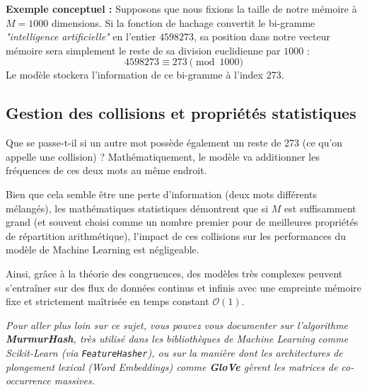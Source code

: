 \textbf{Exemple conceptuel :}
Supposons que nous fixions la taille de notre mémoire à $M = 1000$ dimensions. 
Si la fonction de hachage convertit le bi-gramme \textit{"intelligence artificielle"} en l'entier $4598273$, sa position dans notre vecteur mémoire sera simplement le reste de sa division euclidienne par $1000$ :
$$ 4598273 \equiv 273 \pmod{1000} $$
Le modèle stockera l'information de ce bi-gramme à l'index 273.

\subsection*{Gestion des collisions et propriétés statistiques}

Que se passe-t-il si un autre mot possède également un reste de 273 (ce qu'on appelle une collision) ? Mathématiquement, le modèle va additionner les fréquences de ces deux mots au même endroit. 

Bien que cela semble être une perte d'information (deux mots différents mélangés), les mathématiques statistiques démontrent que si $M$ est suffisamment grand (et souvent choisi comme un nombre premier pour de meilleures propriétés de répartition arithmétique), l'impact de ces collisions sur les performances du modèle de Machine Learning est négligeable. 

Ainsi, grâce à la théorie des congruences, des modèles très complexes peuvent s'entraîner sur des flux de données continus et infinis avec une empreinte mémoire fixe et strictement maîtrisée en temps constant $\mathcal{O}(1)$.

\vspace{0.5cm}
\begin{center}
\textit{Pour aller plus loin sur ce sujet, vous pouvez vous documenter sur l'algorithme \textbf{MurmurHash}, très utilisé dans les bibliothèques de Machine Learning comme Scikit-Learn (via \texttt{FeatureHasher}), ou sur la manière dont les architectures de plongement lexical (Word Embeddings) comme \textbf{GloVe} gèrent les matrices de co-occurrence massives.}
\end{center}